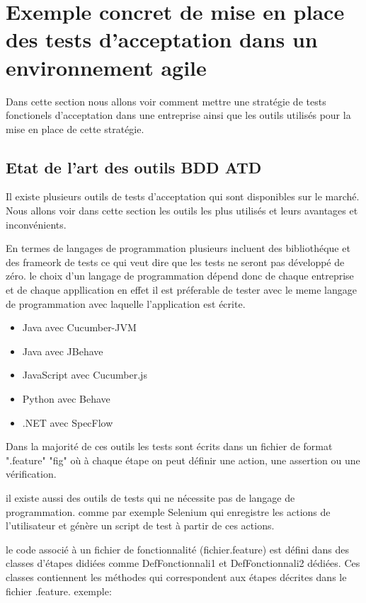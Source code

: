 \chapter[Exemple concret]{Exemple concret de mise en place des tests d'acceptation dans un environnement agile}
\thispagestyle{fancy}
\label{chap:exemples}
Dans cette section nous allons voir comment mettre une stratégie de tests fonctionels d'acceptation dans une entreprise ainsi que les outils utilisés pour la mise en place de cette stratégie.

\section{Etat de l'art des outils BDD ATD}
\label{sec:etat}
Il existe plusieurs outils de tests d'acceptation qui sont disponibles sur le marché. Nous allons voir dans cette section les outils les plus utilisés et leurs avantages et inconvénients.

En termes de langages de programmation plusieurs incluent des bibliothéque et des frameork  de tests ce qui veut dire que les tests ne seront pas développé de zéro.  le choix d'un langage de programmation dépend donc de chaque entreprise et de chaque appllication en effet il est préferable de tester avec le meme langage de programmation avec laquelle l'application est écrite.

\begin{itemize}

\item  Java avec Cucumber-JVM
\item  Java avec JBehave
\item  JavaScript avec Cucumber.js
\item  Python avec Behave
\item  .NET avec SpecFlow

\end{itemize}

Dans la majorité de ces outils les tests sont écrits dans un fichier de format ".feature" "fig" où à chaque étape on peut définir une action, une assertion ou une vérification.

il existe aussi des outils de tests qui ne nécessite pas de langage de programmation. comme par exemple Selenium qui enregistre les actions de l'utilisateur et génère un script de test à partir de ces actions.

le code associé à un fichier de fonctionnalité (fichier.feature) est défini dans des classes d'étapes didiées comme DefFonctionnali1 et DefFonctionnali2 dédiées. Ces classes contiennent les méthodes qui correspondent aux étapes décrites dans le fichier .feature.
exemple:

